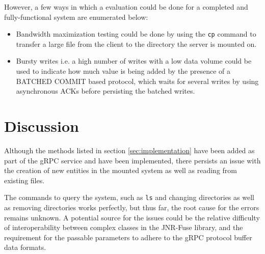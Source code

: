 \documentclass{scrartcl}
\begin{document}
However, a few ways in which a evaluation could be done for a completed and fully-functional system are enumerated below:
\begin{itemize}
    \item 
    Bandwidth maximization testing could be done by using the \texttt{cp} command to transfer a large file from the client to the directory the server is mounted on.
    \item 
    Bursty writes i.e. a high number of writes with a low data volume could be used to indicate how much value is being added by the presence of a BATCHED COMMIT based protocol, which waits for several writes by using asynchronous ACKs before persisting the batched writes.
\end{itemize}

\section{Discussion} \label{sec:discussion}
Although the methods listed in section \ref{sec:implementation} have been added as part of the gRPC service and have been implemented, there persists an issue with the creation of new entities in the mounted system as well as reading from existing files.

The commands to query the system, such as \texttt{ls} and changing directories as well as removing directories works perfectly, but thus far, the root cause for the errors remains unknown. A potential source for the issues could be the relative difficulty of interoperability between complex classes in the JNR-Fuse library, and the requirement for the passable parameters to adhere to the gRPC protocol buffer data formats.



\end{document}
